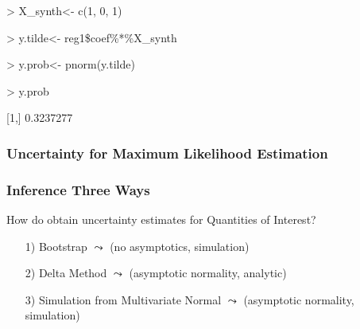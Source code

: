 \documentclass{beamer}
\begin{document}
\begin{frame}

\begin{semiverbatim}

> X\_synth<- c(1, 0, 1)


> y.tilde<- reg1\$coef\%*\%X\_synth


> y.prob<- pnorm(y.tilde)


> y.prob


          
[1,] 0.3237277


\end{semiverbatim}



\end{frame}




\begin{frame}
\frametitle{Uncertainty for Maximum Likelihood Estimation}

\pause 
\begin{itemize}
 \pause 
{} \pause 
\begin{itemize}
 \pause 
{} 
\end{itemize}



\end{itemize}



\end{frame}



\begin{frame}
\frametitle{Inference Three Ways}

How do obtain uncertainty estimates for Quantities of Interest?


\begin{itemize}
\item[1)] Bootstrap $\leadsto$ (no asymptotics, simulation)
\item[2)] Delta Method $\leadsto$ (asymptotic normality, analytic)
\item[3)] Simulation from Multivariate Normal $\leadsto$ (asymptotic normality, simulation)
\end{itemize}


\end{frame}
\end{document}
